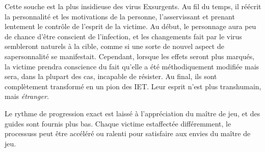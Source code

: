 Cette souche est la plus insidieuse des virus Exsurgents. Au fil du temps, il réécrit la personnalité et les motivations de la personne, l'asservissant et prenant lentement le contrôle de l'esprit de la victime. Au début, le personnage aura peu de chance d'être conscient de l'infection, et les changements fait par le virus sembleront naturels à la cible, comme si une sorte de nouvel aspect de sapersonnalité se manifestait. Cependant, lorsque les effets seront plus marqués, la victime prendra conscience du fait qu'elle a été méthodiquement modifiée mais sera, dans la plupart des cas, incapable de résister. Au final, ils sont complètement transformé en un pion des IET. Leur esprit n'est plus transhumain, mais \textit{étranger.} 

Le rythme de progression exact est laissé à l'appréciation du maître de jeu, et des guides sont fournis plus bas. Chaque victime estaffectée différemment, le processuss peut être accéléré ou ralenti pour satisfaire aux envies du maître de jeu. 




